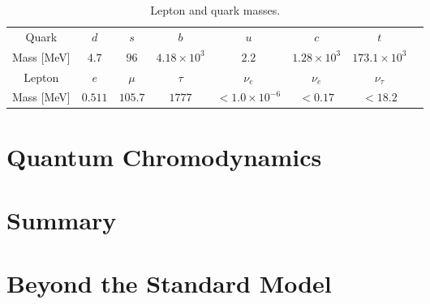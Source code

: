\begin{table}[]
\centering
\caption{Lepton and quark masses.}
\label{tab:SM:masses}
\begin{tabular}{c c c c c c c c}
\hline
Quark & $d$ & $s$ & $b$ & $u$ & $c$ & $t$ & \\
Mass [MeV] & $4.7$ & $96$ & $4.18\times10^3$ & $2.2$ & $1.28\times10^3$ & $173.1\times10^3$\\
\hline
Lepton & $e$ & $\mu$ & $\tau$ & $\nu_e$ & $\nu_e$ & $\nu_\tau$ & \\
Mass [MeV] & $0.511$ & $105.7$ & $1777$ & $<1.0\times10^{-6}$ & $<0.17$ & $<18.2$
\end{tabular}
\end{table}

\section{Quantum Chromodynamics}
\label{sec:SM:QCD}
\section{Summary}
\label{sec:SM:summary}

\section{Beyond the Standard Model}
\label{sec:SM:BSM}

